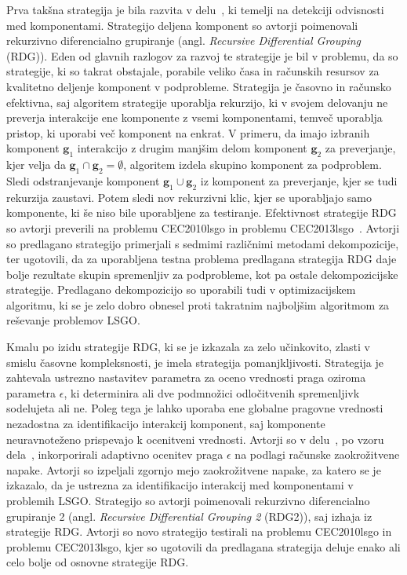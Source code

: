 Prva takšna strategija je bila razvita v delu~\cite{alg:rdg}, ki temelji na detekciji odvisnosti med komponentami.
Strategijo deljena komponent so avtorji poimenovali rekurzivno diferencialno grupiranje (angl. \textit{Recursive Differential Grouping} (RDG)).
Eden od glavnih razlogov za razvoj te strategije je bil v problemu, da so strategije, ki so takrat obstajale, porabile veliko časa in računskih resursov za kvalitetno deljenje komponent v podprobleme.
Strategija je časovno in računsko efektivna, saj algoritem strategije uporablja rekurzijo, ki v svojem delovanju ne preverja interakcije ene komponente z vsemi komponentami, temveč uporablja pristop, ki uporabi več komponent na enkrat.
V primeru, da imajo izbranih komponent $\mathbf{g}_1$ interakcijo z drugim manjšim delom komponent $\mathbf{g}_2$ za preverjanje, kjer velja da $\mathbf{g}_1 \cap \mathbf{g}_2 = \emptyset$, algoritem izdela skupino komponent za podproblem.
Sledi odstranjevanje komponent $\mathbf{g}_1 \cup \mathbf{g}_2$ iz komponent za preverjanje, kjer se tudi rekurzija zaustavi.
Potem sledi nov rekurzivni klic, kjer se uporabljajo samo komponente, ki še niso bile uporabljene za testiranje.
Efektivnost strategije RDG so avtorji preverili na problemu CEC2010lsgo in problemu CEC2013lsgo~\cite{bech:cec2013lsgo}.
Avtorji so predlagano strategijo primerjali s sedmimi različnimi metodami dekompozicije, ter ugotovili, da za uporabljena testna problema predlagana strategija RDG daje bolje rezultate skupin spremenljiv za podprobleme, kot pa ostale dekompozicijske strategije.
Predlagano dekompozicijo so uporabili tudi v optimizacijskem algoritmu, ki se je zelo dobro obnesel proti takratnim najboljšim algoritmom za reševanje problemov LSGO.

Kmalu po izidu strategije RDG, ki se je izkazala za zelo učinkovito, zlasti v smislu časovne kompleksnosti, je imela strategija pomanjkljivosti.
Strategija je zahtevala ustrezno nastavitev parametra za oceno vrednosti praga oziroma parametra $\epsilon$, ki determinira ali dve podmnožici odločitvenih spremenljivk sodelujeta ali ne.
Poleg tega je lahko uporaba ene globalne pragovne vrednosti nezadostna za identifikacijo interakcij komponent, saj komponente neuravnoteženo prispevajo k ocenitveni vrednosti.
Avtorji so v delu~\cite{alg:rdg2}, po vzoru dela~\cite{alg:dg2}, inkorporirali adaptivno ocenitev praga $\epsilon$ na podlagi računske zaokrožitvene napake.
Avtorji so izpeljali zgornjo mejo zaokrožitvene napake, za katero se je izkazalo, da je ustrezna za identifikacijo interakcij med komponentami v problemih LSGO.
Strategijo so avtorji poimenovali rekurzivno diferencialno grupiranje 2 (angl. \textit{Recursive Differential Grouping 2} (RDG2)), saj izhaja iz strategije RDG.
Avtorji so novo strategijo testirali na problemu CEC2010lsgo in problemu CEC2013lsgo, kjer so ugotovili da predlagana strategija deluje enako ali celo bolje od osnovne strategije RDG.

